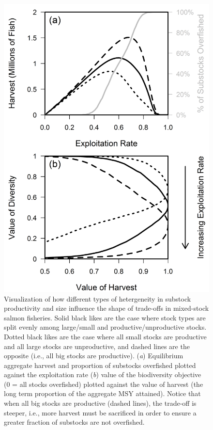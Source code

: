 \documentclass[12pt,]{book}
\theoremstyle{definition}
\theoremstyle{definition}
\theoremstyle{definition}
\theoremstyle{remark}
\begin{document}
\clearpage

\begin{figure}
  \centering
  \includegraphics{img/Ch4/trade-off-plot.png}
  \caption{Visualization of how different types of hetergeneity in substock productivity and size influence the shape of trade-offs in mixed-stock salmon fisheries. Solid black likes are the case where stock types are split evenly among large/small and productive/unproductive stocks. Dotted black likes are the case where all small stocks are productive and all large stocks are unproductive, and dashed lines are the opposite (i.e., all big stocks are productive). (\textit{a}) Equilibrium aggregate harvest and proportion of substocks overfished plotted against the exploitation rate (\textit{b}) value of the biodiversity objective (0 = all stocks overfished) plotted against the value of harvest (the long term proportion of the aggregate MSY attained). Notice that when all big stocks are productive (dashed lines), the trade-off is steeper, i.e., more harvest must be sacrificed in order to ensure a greater fraction of substocks are not overfished. }
  \label{fig:trade-off-plot}
\end{figure}
\end{document}
